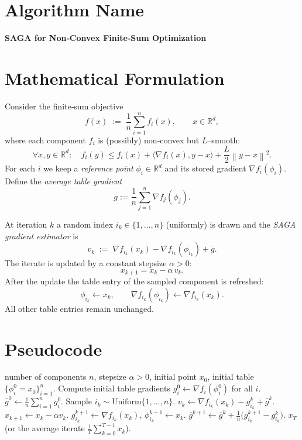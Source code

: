 \documentclass{article}
\newcommand{\R}{\mathbb{R}}
\newcommand{\norm}[1]{\left\|#1\right\|}
\newcommand{\inner}[2]{\langle #1,#2\rangle}
\newcommand{\grad}{\nabla}
\begin{document}
\section*{Algorithm Name}
\textbf{SAGA for Non‑Convex Finite‑Sum Optimization}

\section*{Mathematical Formulation}
Consider the finite‑sum objective
\[
f(x)\;:=\;\frac1n\sum_{i=1}^{n}f_i(x),\qquad x\in\R^{d},
\]
where each component $f_i$ is (possibly) non‑convex but $L$–smooth:
\begin{equation}
\label{eq:smooth}
\forall x,y\in\R^{d}:\quad
f_i(y)\le f_i(x)+\inner{\grad f_i(x)}{y-x}
+\frac{L}{2}\norm{y-x}^{2}.
\end{equation}
For each $i$ we keep a \emph{reference point} $\phi_i\in\R^{d}$ and its stored gradient
$\grad f_i(\phi_i)$.  Define the \emph{average table gradient}
\[
\bar{g}:=\frac1n\sum_{j=1}^{n}\grad f_j(\phi_j).
\]

At iteration $k$ a random index $i_k\!\in\!\{1,\dots,n\}$ (uniformly) is drawn and the
\emph{SAGA gradient estimator} is
\begin{equation}
\label{eq:est}
v_k \;:=\; \grad f_{i_k}(x_k)-\grad f_{i_k}(\phi_{i_k})+\bar{g}.
\end{equation}
The iterate is updated by a constant stepsize $\alpha>0$:
\begin{equation}
\label{eq:update}
x_{k+1}=x_k-\alpha\,v_k .
\end{equation}
After the update the table entry of the sampled component is refreshed:
\[
\phi_{i_k}\gets x_k,\qquad
\grad f_{i_k}(\phi_{i_k})\gets \grad f_{i_k}(x_k).
\]
All other table entries remain unchanged.

\section*{Pseudocode}
\begin{algorithm}[H]
\caption{SAGA (non‑convex)}\label{alg:saga}
\begin{algorithmic}[1]
\REQUIRE number of components $n$, stepsize $\alpha>0$, 
initial point $x_{0}$, initial table $\{\phi_i^{0}=x_{0}\}_{i=1}^{n}$.
\STATE Compute initial table gradients $g_i^{0}\gets\grad f_i(\phi_i^{0})$ for all $i$.
\STATE $\bar g^{0}\gets\frac1n\sum_{i=1}^{n}g_i^{0}$.
    \STATE Sample $i_k\sim\text{Uniform}\{1,\dots,n\}$.
    \STATE $v_k\gets\grad f_{i_k}(x_k)-g_{i_k}^{k}+\bar g^{k}$.
    \STATE $x_{k+1}\gets x_k-\alpha v_k$.
    \STATE $g_{i_k}^{k+1}\gets\grad f_{i_k}(x_k)$,
          $\phi_{i_k}^{k+1}\gets x_k$.
    \STATE $\bar g^{k+1}\gets\bar g^{k}+ \frac1n\bigl(g_{i_k}^{k+1}-g_{i_k}^{k}\bigr)$.
\ENDFOR
\RETURN $x_T$ (or the average iterate $\frac1T\sum_{k=0}^{T-1}x_k$).
\end{algorithmic}
\end{algorithm}
\end{document}
